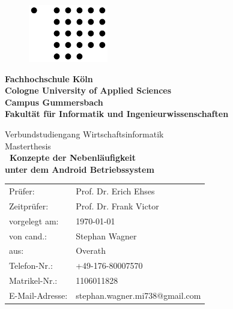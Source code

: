 \documentclass[12pt,oneside,a4paper,bibtotoc,liststotoc]{scrreprt}
\begin{document}
\begin{titlepage} 
\begin{figure}[H]
  \begin{flushright}
    \includegraphics{img/fh-koeln-logo.png}
    \label{logo_fh_köln}
  \end{flushright}
\end{figure}

\begin{center}
\textbf{\Large\newline  Fachhochschule Köln\\
Cologne University of Applied Sciences\\[0.1cm]
\normalsize Campus Gummersbach\\
Fakultät für Informatik und Ingenieurwissenschaften\\[0.5cm]}

 
\Large Verbundstudiengang Wirtschaftsinformatik\\[0.5cm]

\large Masterthesis\\[0.1cm]
  
{ \huge \bfseries \ Konzepte der Nebenläufigkeit  \\[0.1cm]
        unter dem Android Betriebssystem\\[0.5cm]
        
}
\vfill

\begin{table}[h]
\centering
\begin{tabular}{ll}
  Prüfer:         & Prof. Dr. Erich Ehses \\
  Zeitprüfer:     & Prof. Dr. Frank Victor \\
  vorgelegt am:   & \today \\
  von cand.:      & Stephan Wagner \\
  aus:            & Overath \\
  Telefon-Nr.:    & +49-176-80007570 \\
  Matrikel-Nr.:   & 1106011828 \\
  E-Mail-Adresse: & stephan.wagner.mi738@gmail.com
\end{tabular}
\end{table}
\end{center}
\end{titlepage}
\end{document}
